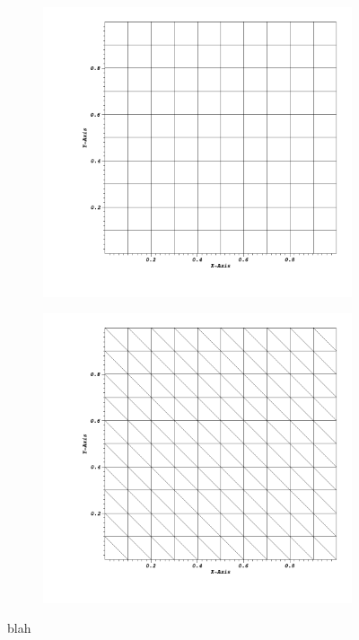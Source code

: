 \begin{figure}
\label{fig::IP_cart_tri_meshes}
\centering
	\begin{subfigure}[b]{0.48\textwidth}
		\centering
		\includegraphics[width=\textwidth]{figures/sec_DSA/IP_cart_mesh.png}
		\caption{}
	\end{subfigure}
	\hfill
	\begin{subfigure}[b]{0.48\textwidth}
		\centering
		\includegraphics[width=\textwidth]{figures/sec_DSA/IP_tri_mesh.png}
		\caption{}
	\end{subfigure}
\caption{blah}
\end{figure}

